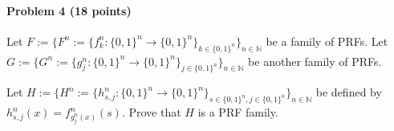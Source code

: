 
\paragraph{Problem 4 (18 points)}

Let $F:=\{ F^n:=\{ f^n_k: \{0,1\}^n \to \{0,1\}^n  \}_{k\in \{0,1\}^{n}} \}_{n\in\mathbb{N}}$ be a family of PRFs. 
Let $G:=\{ G^n:=\{ g^n_j: \{0,1\}^n \to \{0,1\}^n  \}_{j\in \{0,1\}^{n}} \}_{n\in\mathbb{N}}$ be another family of PRFs. 

Let $H:=\{ H^n:=\{ h^n_{s,j}: \{0,1\}^n \to \{0,1\}^n  \}_{s\in\{0,1\}^n, j\in\{0,1\}^n } \}_{n\in\mathbb{N}}$ be defined by $h^n_{s,j}(x) = f^n_{g^n_j(x)}(s)$. Prove that $H$ is a PRF family. 
